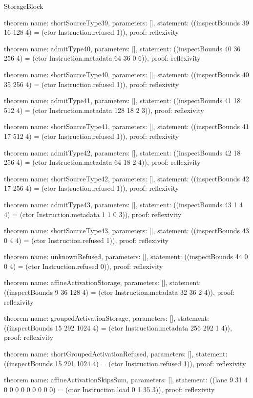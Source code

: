 \begin{lexlean}{StorageBlock}
\begin{semanticmodule}
theorem{
  name: shortSourceType39,
  parameters: [],
  statement: ((inspectBounds 39 16 128 4) = (ctor Instruction.refused 1)),
  proof: reflexivity{}
}

theorem{
  name: admitType40,
  parameters: [],
  statement: ((inspectBounds 40 36 256 4) = (ctor Instruction.metadata 64 36 0 6)),
  proof: reflexivity{}
}

theorem{
  name: shortSourceType40,
  parameters: [],
  statement: ((inspectBounds 40 35 256 4) = (ctor Instruction.refused 1)),
  proof: reflexivity{}
}

theorem{
  name: admitType41,
  parameters: [],
  statement: ((inspectBounds 41 18 512 4) = (ctor Instruction.metadata 128 18 2 3)),
  proof: reflexivity{}
}

theorem{
  name: shortSourceType41,
  parameters: [],
  statement: ((inspectBounds 41 17 512 4) = (ctor Instruction.refused 1)),
  proof: reflexivity{}
}

theorem{
  name: admitType42,
  parameters: [],
  statement: ((inspectBounds 42 18 256 4) = (ctor Instruction.metadata 64 18 2 4)),
  proof: reflexivity{}
}

theorem{
  name: shortSourceType42,
  parameters: [],
  statement: ((inspectBounds 42 17 256 4) = (ctor Instruction.refused 1)),
  proof: reflexivity{}
}

theorem{
  name: admitType43,
  parameters: [],
  statement: ((inspectBounds 43 1 4 4) = (ctor Instruction.metadata 1 1 0 3)),
  proof: reflexivity{}
}

theorem{
  name: shortSourceType43,
  parameters: [],
  statement: ((inspectBounds 43 0 4 4) = (ctor Instruction.refused 1)),
  proof: reflexivity{}
}

theorem{
  name: unknownRefused,
  parameters: [],
  statement: ((inspectBounds 44 0 0 4) = (ctor Instruction.refused 0)),
  proof: reflexivity{}
}

theorem{
  name: affineActivationStorage,
  parameters: [],
  statement: ((inspectBounds 9 36 128 4) = (ctor Instruction.metadata 32 36 2 4)),
  proof: reflexivity{}
}

theorem{
  name: groupedActivationStorage,
  parameters: [],
  statement: ((inspectBounds 15 292 1024 4) = (ctor Instruction.metadata 256 292 1 4)),
  proof: reflexivity{}
}

theorem{
  name: shortGroupedActivationRefused,
  parameters: [],
  statement: ((inspectBounds 15 291 1024 4) = (ctor Instruction.refused 1)),
  proof: reflexivity{}
}

theorem{
  name: affineActivationSkipsSum,
  parameters: [],
  statement: ((lane 9 31 4 0 0 0 0 0 0 0 0 0) = (ctor Instruction.load 0 1 35 3)),
  proof: reflexivity{}
}


\end{semanticmodule}
\end{lexlean}
